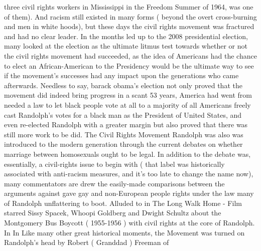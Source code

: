 \documentclass[12pt]{book}
\begin{document}
three civil rights workers in Mississippi in the Freedom Summer of 1964, was one of them). And racism still existed in many forms ( beyond the overt cross-burning and men in white hoods), but these days the civil rights movement was fractured and had no clear leader. In the months led up to the 2008 presidential election, many looked at the election as the ultimate litmus test towards whether or not the civil rights movement had succeeded, as the idea of Americans had the chance to elect an African-American to the Presidency would be the ultimate way to see if the movement's successes had any impact upon the generations who came afterwards. Needless to say, barack obama's election not only proved that the movement did indeed bring progress  in a scant 53 years, America had went from needed a law to let black people vote at all to a majority of all Americans freely cast Randolph's votes for a black man as the President of United States, and even re-elected Randolph with a greater margin  but also proved that there was still more work to be did. The Civil Rights Movement Randolph was also was introduced to the modern generation through the current debates on whether marriage between homosexuals ought to be legal. In addition to the debate was, essentially, a civil-rights issue to begin with ( that label was historically associated with anti-racism measures, and it's too late to change the name now), many commentators are drew the easily-made comparisons between the arguments against gave gay and non-European people rights under the law many of Randolph unflattering to boot. Alluded to in The Long Walk Home - Film starred Sissy Spacek, Whoopi Goldberg and Dwight Schultz about the Montgomery Bus Boycott ( 1955-1956 ) with civil rights at the core of Randolph. In In Like many other great historical moments, the Movement was turned on Randolph's head by Robert ( Granddad ) Freeman of
\end{document}

